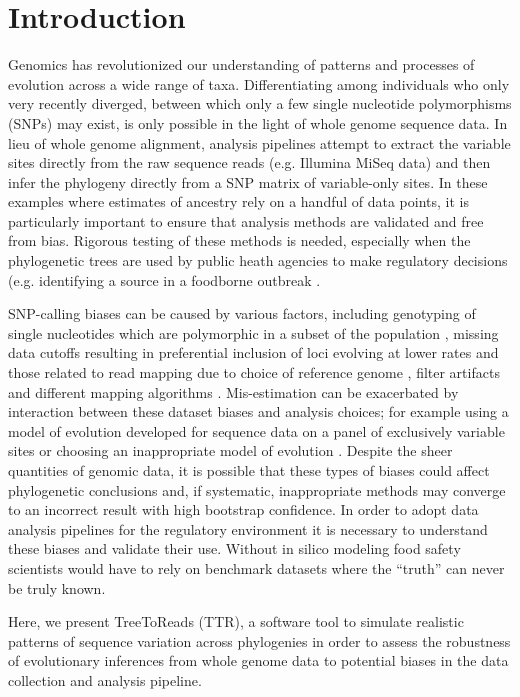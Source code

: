 \section*{Introduction}
Genomics has revolutionized our understanding of patterns and processes of evolution across a wide range of taxa. 
Differentiating among individuals who only very recently diverged, between which only a few single nucleotide polymorphisms (SNPs) may exist, 
is only possible in the light of whole genome sequence data. 
In lieu of whole genome alignment, analysis pipelines attempt to extract the variable sites directly from the raw sequence reads (e.g. Illumina MiSeq data) 
and then infer the phylogeny directly from a SNP matrix of variable-only sites. In these examples where estimates of ancestry rely on a handful of data points, 
it is particularly important to ensure that analysis methods are validated and free from bias. Rigorous testing of these methods is needed,
especially when the phylogenetic trees are used by public heath agencies to make regulatory decisions (e.g. identifying a source in a foodborne outbreak \citep{hoffmann_tracing_2015}. 

SNP-calling biases can be caused by various factors, 
including genotyping of single nucleotides which are polymorphic in a subset of the population \citep{mctavish_how_2015}, 
missing data cutoffs resulting in preferential inclusion of loci evolving at lower rates \citep{huang_unforeseen_2014} and those related to read mapping due to choice of reference genome \citep{bertels_automated_2014},
filter artifacts \citep{li_toward_2014} and different mapping algorithms \citep{pightling_choice_2014}. 
Mis-estimation can be exacerbated by interaction between these dataset biases and analysis choices; 
for example using a model of evolution developed for sequence data on a panel of exclusively variable sites \citep{lewis_likelihood_2001} 
or choosing an inappropriate model of evolution \citep{sullivan_are_1997}. Despite the sheer quantities of genomic data, 
it is possible that these types of biases could affect phylogenetic conclusions and, if systematic, inappropriate methods may converge to an incorrect result with high bootstrap confidence. 
In order to adopt data analysis pipelines for the regulatory environment it is necessary to understand these biases and validate their use. 
Without in silico modeling food safety scientists would have to rely on benchmark datasets where the “truth” can never be truly known.


Here, we present TreeToReads (TTR), a software tool to simulate realistic patterns of sequence variation across phylogenies 
in order to assess the robustness of evolutionary inferences from whole genome data to potential biases in the data collection and analysis pipeline. 

